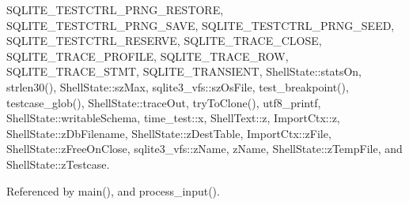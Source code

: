 S\+Q\+L\+I\+T\+E\+\_\+\+T\+E\+S\+T\+C\+T\+R\+L\+\_\+\+P\+R\+N\+G\+\_\+\+R\+E\+S\+T\+O\+RE, S\+Q\+L\+I\+T\+E\+\_\+\+T\+E\+S\+T\+C\+T\+R\+L\+\_\+\+P\+R\+N\+G\+\_\+\+S\+A\+VE, S\+Q\+L\+I\+T\+E\+\_\+\+T\+E\+S\+T\+C\+T\+R\+L\+\_\+\+P\+R\+N\+G\+\_\+\+S\+E\+ED, S\+Q\+L\+I\+T\+E\+\_\+\+T\+E\+S\+T\+C\+T\+R\+L\+\_\+\+R\+E\+S\+E\+R\+VE, S\+Q\+L\+I\+T\+E\+\_\+\+T\+R\+A\+C\+E\+\_\+\+C\+L\+O\+SE, S\+Q\+L\+I\+T\+E\+\_\+\+T\+R\+A\+C\+E\+\_\+\+P\+R\+O\+F\+I\+LE, S\+Q\+L\+I\+T\+E\+\_\+\+T\+R\+A\+C\+E\+\_\+\+R\+OW, S\+Q\+L\+I\+T\+E\+\_\+\+T\+R\+A\+C\+E\+\_\+\+S\+T\+MT, S\+Q\+L\+I\+T\+E\+\_\+\+T\+R\+A\+N\+S\+I\+E\+NT, Shell\+State\+::stats\+On, strlen30(), Shell\+State\+::sz\+Max, sqlite3\+\_\+vfs\+::sz\+Os\+File, test\+\_\+breakpoint(), testcase\+\_\+glob(), Shell\+State\+::trace\+Out, try\+To\+Clone(), utf8\+\_\+printf, Shell\+State\+::writable\+Schema, time\+\_\+test\+::x, Shell\+Text\+::z, Import\+Ctx\+::z, Shell\+State\+::z\+Db\+Filename, Shell\+State\+::z\+Dest\+Table, Import\+Ctx\+::z\+File, Shell\+State\+::z\+Free\+On\+Close, sqlite3\+\_\+vfs\+::z\+Name, z\+Name, Shell\+State\+::z\+Temp\+File, and Shell\+State\+::z\+Testcase.



Referenced by main(), and process\+\_\+input().


